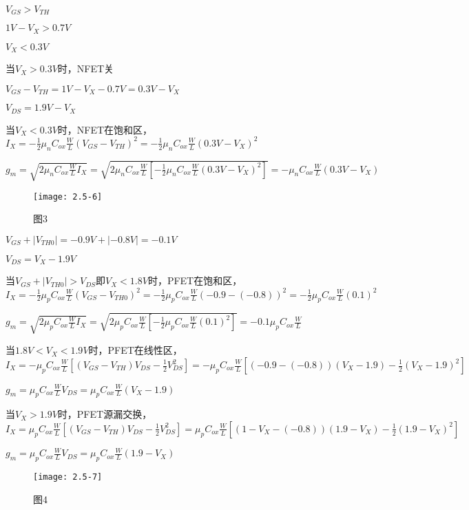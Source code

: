 {	\scalebox{3}{（c）}
	
	$V_{GS}>V_{TH}$
	
	$1V-V_{X}>0.7V$
	
	$V_{X}<0.3V$
	
	当$V_X>0.3V$时，NFET关
	
	$V_{GS}-V_{TH}=1V-V_{X}-0.7V=0.3V-V_{X}$
	
	$V_{DS}=1.9V-V_{X}$
	
	当$V_X<0.3V$时，NFET在饱和区，$I_X=-\frac{1}{2}\mu_nC_{ox}\frac{W}{L}(V_{GS}-V_{TH})^2=-\frac{1}{2}\mu_nC_{ox}\frac{W}{L}(0.3V-V_{X})^2$
	
	$g_m=\sqrt{2\mu_nC_{ox}\frac{W}{L}I_X}=\sqrt{2\mu_nC_{ox}\frac{W}{L}[-\frac{1}{2}\mu_nC_{ox}\frac{W}{L}(0.3V-V_{X})^2]}=-\mu_nC_{ox}\frac{W}{L}(0.3V-V_{X})$
	
				\begin{figure}[H] %
		\begin{minipage}{\linewidth}
			\texttt{[image: 2.5-6]}
		\end{minipage}
		\caption*{图3} %
	\end{figure}
	
	\scalebox{3}{（d）}
	
	$V_{GS}+|V_{TH0}|=-0.9V+|-0.8V|=-0.1V$
	
	$V_{DS}=V_{X}-1.9V$
	
	当$V_{GS}+|V_{TH0}|>V_{DS}\text{即}V_X<1.8V$时，PFET在饱和区，$I_X=-\frac{1}{2}\mu_pC_{ox}\frac{W}{L}(V_{GS}-V_{TH0})^2=-\frac{1}{2}\mu_pC_{ox}\frac{W}{L}(-0.9-(-0.8))^2=-\frac{1}{2}\mu_pC_{ox}\frac{W}{L}(0.1)^2$
	
	$g_m=\sqrt{2\mu_pC_{ox}\frac{W}{L}I_X}=\sqrt{2\mu_pC_{ox}\frac{W}{L}[-\frac{1}{2}\mu_pC_{ox}\frac{W}{L}(0.1)^2]}=-0.1\mu_pC_{ox}\frac{W}{L}$
	
	当$1.8V<V_X<1.9V$时，PFET在线性区，$I_X=-\mu_pC_{ox}\frac{W}{L}[(V_{GS}-V_{TH})V_{DS}-\frac{1}{2}V_{DS}^2]=-\mu_pC_{ox}\frac{W}{L}[(-0.9-(-0.8))(V_{X}-1.9)-\frac{1}{2}(V_{X}-1.9)^2]$
	
	$g_m=\mu_pC_{ox}\frac{W}{L}V_{DS}=\mu_pC_{ox}\frac{W}{L}(V_{X}-1.9)$
	
	当$V_X>1.9V$时，PFET源漏交换，$I_X=\mu_pC_{ox}\frac{W}{L}[(V_{GS}-V_{TH})V_{DS}-\frac{1}{2}V_{DS}^2]=\mu_pC_{ox}\frac{W}{L}[(1-V_{X}-(-0.8))(1.9-V_{X})-\frac{1}{2}(1.9-V_{X})^2]$
	
	$g_m=\mu_pC_{ox}\frac{W}{L}V_{DS}=\mu_pC_{ox}\frac{W}{L}(1.9-V_{X})$
	
					\begin{figure}[H] %
		\begin{minipage}{\linewidth}
			\texttt{[image: 2.5-7]}
		\end{minipage}
		\caption*{图4} %
	\end{figure}
	
}
